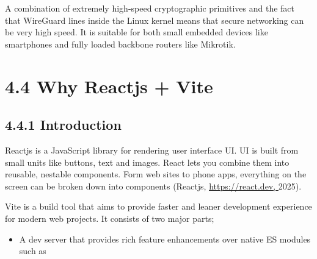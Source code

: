 \documentclass[12pt,a4paper,oneside]{report}
\begin{document}
A combination of extremely high-speed cryptographic primitives and the fact that WireGuard lines inside the Linux kernel means that secure networking can be very high speed. It is suitable for both small embedded devices like smartphones and fully loaded backbone routers like Mikrotik.














































\section{4.4 Why Reactjs + Vite}

\subsection{4.4.1 Introduction}

Reactjs is a JavaScript library for rendering user interface UI. UI is built from small units like buttons, text and images. React lets you combine them into reusable, nestable components. Form web sites to phone apps, everything on the screen can be broken down into components (Reactjs, \href{https://react.dev/}{\uline{https://react.dev,}}\href{https://react.dev/}{ }2025).


Vite is a build tool that aims to provide faster and leaner development experience for modern web projects. It consists of two major parts;


\begin{itemize}
  \item A dev server that provides rich feature enhancements over native ES modules such as
\end{itemize}
\end{document}
